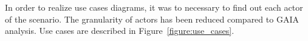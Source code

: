 \documentclass[a4paper,11pt]{report}
\begin{document}
  
  
  In order to realize use cases diagrams, it was to necessary to find out each actor 
  of the scenario. The granularity of actors has been reduced compared to GAIA analysis. 
  Use cases are described in Figure~\ref{figure:use_cases}.
  
\end{document}
